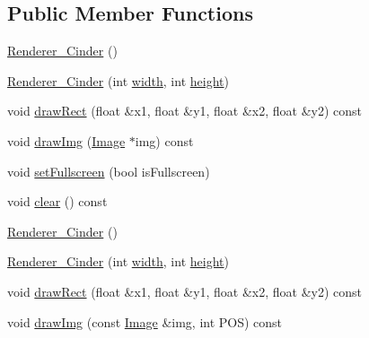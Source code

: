 \subsection*{Public Member Functions}
\begin{DoxyCompactItemize}
\item 
\hyperlink{class_renderer___cinder_a8c177c966411a66dde2ffe0986110183}{Renderer\-\_\-\-Cinder} ()
\item 
\hyperlink{class_renderer___cinder_af66dfa977f433a3fba7c74fd8afdb292}{Renderer\-\_\-\-Cinder} (int \hyperlink{class_renderer___a_a0ca3fbb31eb776ee00b70536f267dfe7}{width}, int \hyperlink{class_renderer___a_a36d0dfb8eeccad9e1ff0b0c461632f6a}{height})
\item 
void \hyperlink{class_renderer___cinder_ae14f510b0f03226b9067ad11b3711c13}{draw\-Rect} (float \&x1, float \&y1, float \&x2, float \&y2) const 
\item 
void \hyperlink{class_renderer___cinder_abe70ac6d46e0cf38878e470ebc2b0350}{draw\-Img} (\hyperlink{class_image}{Image} $\ast$img) const 
\item 
void \hyperlink{class_renderer___cinder_a8903673b17ff5bf042a4408ab064e92e}{set\-Fullscreen} (bool is\-Fullscreen)
\item 
void \hyperlink{class_renderer___cinder_a9602d7d3306fa590f77d6f401da561f9}{clear} () const 
\item 
\hyperlink{class_renderer___cinder_a8c177c966411a66dde2ffe0986110183}{Renderer\-\_\-\-Cinder} ()
\item 
\hyperlink{class_renderer___cinder_af66dfa977f433a3fba7c74fd8afdb292}{Renderer\-\_\-\-Cinder} (int \hyperlink{class_renderer___a_a0ca3fbb31eb776ee00b70536f267dfe7}{width}, int \hyperlink{class_renderer___a_a36d0dfb8eeccad9e1ff0b0c461632f6a}{height})
\item 
void \hyperlink{class_renderer___cinder_ae14f510b0f03226b9067ad11b3711c13}{draw\-Rect} (float \&x1, float \&y1, float \&x2, float \&y2) const 
\item 
void \hyperlink{class_renderer___cinder_ad6700d502a42c60b2c97dd6e2b44b80a}{draw\-Img} (const \hyperlink{class_image}{Image} \&img, int P\-O\-S) const 
\end{DoxyCompactItemize}
